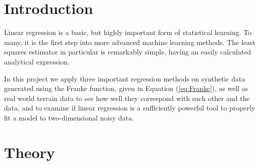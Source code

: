 \documentclass[a4paper, 10pt]{article}
\begin{document}
\begin{multicols}{2}
\section{Introduction}

Linear regression is a basic, but highly important form of statistical learning. To many, it is the first step into more advanced machine learning methods. The least squares estimator in particular is remarkably simple, having an easily calculated analytical expression.

In this project we apply three important regression methods on synthetic data generated using the Franke function, given in Equation (\ref{eq:Franke}), as well as real world terrain data to see how well they correspond with each other and the data, and to examine if linear regression is a sufficiently powerful tool to properly fit a model to two-dimensional noisy data.


\section{Theory}

\end{multicols}
\end{document}
